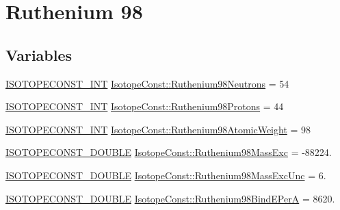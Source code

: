 \hypertarget{group___isotope_const-_ruthenium-_ru98}{}\section{Ruthenium 98}
\label{group___isotope_const-_ruthenium-_ru98}
\subsection*{Variables}
\begin{DoxyCompactItemize}
\item 
\mbox{\hyperlink{group___isotope_const-_macros_ga5f18360b3e99483a35c32d789e62621c}{I\+S\+O\+T\+O\+P\+E\+C\+O\+N\+S\+T\+\_\+\+I\+NT}} \mbox{\hyperlink{group___isotope_const-_ruthenium-_ru98_gafe57a6fe207787b1036d897f7efecef5}{Isotope\+Const\+::\+Ruthenium98\+Neutrons}} = 54
\item 
\mbox{\hyperlink{group___isotope_const-_macros_ga5f18360b3e99483a35c32d789e62621c}{I\+S\+O\+T\+O\+P\+E\+C\+O\+N\+S\+T\+\_\+\+I\+NT}} \mbox{\hyperlink{group___isotope_const-_ruthenium-_ru98_gaf1305798d92239d2cce208e06a2e37c1}{Isotope\+Const\+::\+Ruthenium98\+Protons}} = 44
\item 
\mbox{\hyperlink{group___isotope_const-_macros_ga5f18360b3e99483a35c32d789e62621c}{I\+S\+O\+T\+O\+P\+E\+C\+O\+N\+S\+T\+\_\+\+I\+NT}} \mbox{\hyperlink{group___isotope_const-_ruthenium-_ru98_ga6ab617b6efd5e6867579bf9c3e418898}{Isotope\+Const\+::\+Ruthenium98\+Atomic\+Weight}} = 98
\item 
\mbox{\hyperlink{group___isotope_const-_macros_ga8f45a7272ce02c0b4c65c44636ed719a}{I\+S\+O\+T\+O\+P\+E\+C\+O\+N\+S\+T\+\_\+\+D\+O\+U\+B\+LE}} \mbox{\hyperlink{group___isotope_const-_ruthenium-_ru98_ga9343c9136adb914af1064c14c2bf255f}{Isotope\+Const\+::\+Ruthenium98\+Mass\+Exc}} = -\/88224.
\item 
\mbox{\hyperlink{group___isotope_const-_macros_ga8f45a7272ce02c0b4c65c44636ed719a}{I\+S\+O\+T\+O\+P\+E\+C\+O\+N\+S\+T\+\_\+\+D\+O\+U\+B\+LE}} \mbox{\hyperlink{group___isotope_const-_ruthenium-_ru98_gabc6b2381423e5d47122fa626157cffe9}{Isotope\+Const\+::\+Ruthenium98\+Mass\+Exc\+Unc}} = 6.
\item 
\mbox{\hyperlink{group___isotope_const-_macros_ga8f45a7272ce02c0b4c65c44636ed719a}{I\+S\+O\+T\+O\+P\+E\+C\+O\+N\+S\+T\+\_\+\+D\+O\+U\+B\+LE}} \mbox{\hyperlink{group___isotope_const-_ruthenium-_ru98_ga879978bb644482b84d5e33893c195bae}{Isotope\+Const\+::\+Ruthenium98\+Bind\+E\+PerA}} = 8620.
\item 

\end{DoxyCompactItemize}
